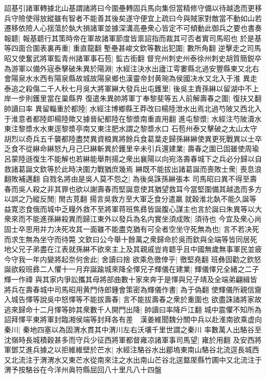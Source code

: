詔基引諸軍轉據北山基謂諸將曰今圍壘轉固兵馬向集但當精修守備以待越逸而更移兵守險使得放縱雖有智者不能善其後矣遂守便宜上疏曰今與賊家對敵當不動如山若遷移依險人心揺蕩於埶大損諸軍並據深溝高壘衆心皆定不可傾動此御兵之要也書奏報聼|{
	報基聼行其策時帝在軍故諸軍節度皆禀詔指而裁其可否者實司馬昭也}
於是基等四面合圍表裏再重|{
	重直龍翻}
塹壘甚峻文欽等數出犯圍|{
	數所角翻}
逆擊走之司馬昭又使奮武將軍監青州諸軍事石苞|{
	監古銜翻}
督兖州刺史州泰徐州刺史胡質簡鋭卒為游軍以備外宼泰擊破朱異於陽淵|{
	水經注決水出廬江雩婁縣北過安豐縣東又北右會陽泉水水西有陽泉縣故城故陽泉鄉也漢靈帝封黄琬為侯國决水又北入于淮}
異走泰追之殺傷二千人秋七月吳大將軍綝大發兵出屯鑊里|{
	後吳主責孫綝以留湖中不上岸一步則鑊里當在巢縣界}
復遣朱異帥將軍丁奉黎斐等五人前解壽春之圍|{
	復扶又翻帥讀曰率}
異留輜重於都陸|{
	水經注博鄉縣王莽改曰楊陸泄水出焉北過芍陂又西北入于淮意者都陸即楊陸歟又據晉紀都陸在黎漿南重直用翻}
進屯黎漿|{
	水經注芍陂瀆水東注黎漿水水東逕黎漿亭南又東注肥水謂之黎漿水口}
石苞州泰又擊破之太山太守胡烈以奇兵五千襲都陸盡焚異資粮異將餘兵食葛葉走歸孫綝綝使異更死戰異以士卒乏食不從綝命綝怒九月己巳綝斬異於鑊里辛未引兵還建業|{
	壽春之圍已固雖使周瑜呂蒙陸遜復生不能解也若綝能舉荆揚之衆出襄陽以向宛洛壽春城下之兵必分歸以自救諸葛誕文欽等於此時决圍力戰猶庶幾焉}
綝既不能拔出諸葛誕而喪敗士衆|{
	喪息浪翻敗補邁翻}
自戮名將由是吳人莫不怨之|{
	為後吳誅孫綝張本}
司馬昭曰異不得至壽春而吳人殺之非其罪也欲以謝壽春而堅誕意使其猶望救耳今當堅圍備其越逸而多方以誤之乃縱反閒|{
	閒古莧翻}
揚言吳救方至大軍乏食分遣羸就穀淮北埶不能久誕等益寛恣食俄而城中乏糧外救不至將軍蒋班焦彞皆誕腹心謀主也言於誕曰朱異等以大衆來而不能進孫綝殺異而歸江東外以發兵為名内實坐須成敗|{
	須待也}
今宜及衆心尚固士卒思用并力决死攻其一面雖不能盡克猶有可全者空坐守死無為也|{
	言不若决死而求生無為坐守而待斃}
文欽曰公今舉十餘萬之衆歸命於吳而欽與全端等皆同居死地父兄子弟盡在江表就孫綝不欲來主上及其親戚豈肯聼乎且中國無歲無事軍民並疲今守我一年内變將起奈何舍此|{
	舍讀曰捨}
欲乘危徼倖乎|{
	徼堅堯翻}
班彝固勸之欽怒誕欲殺班彞二人懼十一月弃誕踰城來降全懌兄子輝儀在建業|{
	輝儀懌兄全緒之二子輝一作禕}
與其家内爭訟攜其母將部曲數十家來奔于是懌與兄子靖及全端弟翩緝皆將兵在壽春城中司馬昭用黄門侍郎鍾會策密為輝儀作書|{
	為于偽翻}
使輝儀所親信齎入城告懌等說吳中怒懌等不能拔壽春|{
	言不能拔壽春之衆於重圍也}
欲盡誅諸將家故逃來歸命十二月懌等帥其衆數千人開門出降|{
	帥讀曰率降戶江翻}
城中震懼不知所為詔拜懌平東將軍封臨湘侯端等封拜各有差　漢姜維聞魏分關中兵以赴淮南欲乘虚向秦川|{
	秦地四塞以為固渭水貫其中渭川左右沃壤千里世謂之秦川}
率數萬人出駱谷至沈嶺時長城積穀甚多而守兵少征西將軍都督雍凉諸軍事司馬望|{
	雍於用翻}
及安西將軍鄧艾進兵據之以拒維維壁於芒水|{
	水經注駱谷水出郿塢東南山駱谷北流逕長城西又北流注于渭渭水又東芒水從南來注之水出南山芒谷北逕盩厔縣竹圃中又北流注于渭予按駱谷在今洋州眞符縣屈回八十里凡八十四盤}
